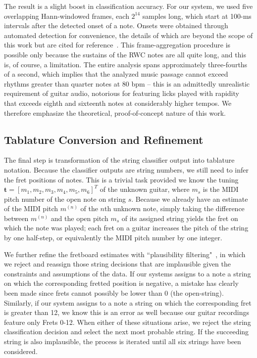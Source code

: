 \documentclass[12pt]{cmuthesis}
\begin{document}
The result is a slight boost in classification accuracy. For our system, we used five overlapping Hann-windowed frames, each $2^{14}$ samples long, which start at 100-ms intervals after the detected onset of a note. Onsets were obtained through automated detection for convenience, the details of which are beyond the scope of this work but are cited for reference~\cite{bello2005,dixon2006}. This frame-aggregation procedure is possible only because the sustains of the RWC notes are all quite long, and this is, of course, a limitation. The entire analysis spans approximately three-fourths of a second, which implies that the analyzed music passage cannot exceed rhythms greater than quarter notes at 80 bpm -- this is an admittedly unrealistic requirement of guitar audio, notorious for featuring licks played with rapidity that exceeds eighth and sixteenth notes at considerably higher tempos. We therefore emphasize the theoretical, proof-of-concept nature of this work.

\subsection{Tablature Conversion and Refinement}
The final step is transformation of the string classifier output into tablature notation. Because the classifier outputs are string numbers, we still need to infer the fret positions of notes. This is a trivial task provided we know the tuning $\mathbf{t} = [m_1, m_2, m_3, m_4, m_5, m_6]^T$ of the unknown guitar, where $m_s$ is the MIDI pitch number of the open note on string $s$. Because we already have an estimate of the MIDI pitch $m^{(n)}$ of the $n$th unknown note, simply taking the difference between $m^{(n)}$ and the open pitch $m_s$ of its assigned string yields the fret on which the note was played; each fret on a guitar increases the pitch of the string by one half-step, or equivalently the MIDI pitch number by one integer.

We further refine the fretboard estimates with ``plausibility filtering"~\cite{abesser2012}, in which we reject and reassign those string decisions that are implausible given the constraints and assumptions of the data. If our systems assigns to a note a string on which the corresponding fretted position is negative, a mistake has clearly been made since frets cannot possibly be lower than 0 (the open-string). Similarly, if our system assigns to a note a string on which the corresponding fret is greater than 12, we know this is an error as well because our guitar recordings feature only Frets 0-12. When either of these situations arise, we reject the string classification decision and select the next most probable string. If the succeeding string is also implausible, the process is iterated until all six strings have been considered.
\end{document}
